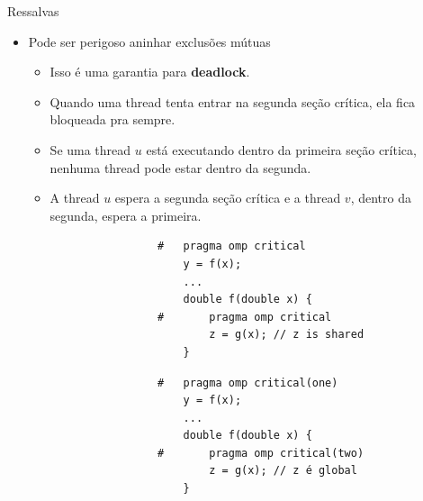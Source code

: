 	\begin{frame}[fragile]{Ressalvas}
		\begin{itemize}
			\item Pode ser perigoso aninhar exclusões mútuas
			\begin{itemize}
				\item Isso é uma garantia para \textbf{deadlock}.
				\item Quando uma thread tenta entrar na segunda seção crítica, ela fica bloqueada pra sempre.
				\item Se uma thread $u$ está executando dentro da primeira seção crítica, nenhuma thread pode estar dentro da segunda.
				\item A thread $u$ espera a segunda seção crítica e a thread $v$, dentro da segunda,  espera a primeira.
			\end{itemize}

			\begin{multicols}{2}
				\begin{verbatim}
					#	pragma omp critical
						y = f(x);
						...
						double f(double x) {
					#		pragma omp critical
							z = g(x); // z is shared
						}
				\end{verbatim}
			\columnbreak
				\pause
				\begin{verbatim}
					#	pragma omp critical(one)
						y = f(x);
						...
						double f(double x) {
					#		pragma omp critical(two)
							z = g(x); // z é global
						}
				\end{verbatim}
			\end{multicols}
		\end{itemize}
\end{frame}

